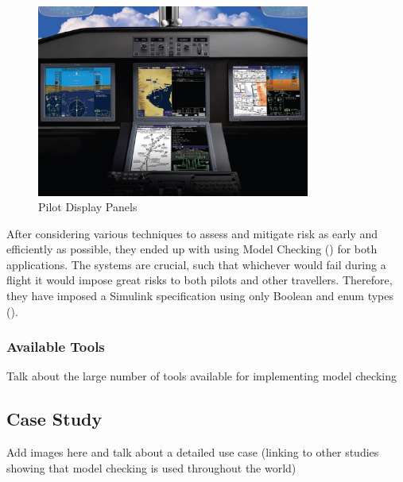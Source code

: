 \documentclass[paper=a4, fontsize=11pt]{scrartcl} %
\numberwithin{equation}{section} %
\numberwithin{figure}{section} %
\numberwithin{table}{section} %
\begin{document}
\begin{figure}[!ht]
    \centering
    \includegraphics[width=0.8\textwidth]{display-panels.jpg}
    \caption{Pilot Display Panels}
    \label{fig:awesome_image}
\end{figure}

After considering various techniques to assess and mitigate risk as early and efficiently as possible, they ended up with using Model Checking (\citet{rockwell-collins}) for both applications. The systems are crucial, such that whichever would fail during a flight it would impose great risks to both pilots and other travellers. Therefore, they have imposed a Simulink specification using only Boolean and enum types (\citet{acm-model-checking}).



\subsubsection{Available Tools}

\par
Talk about the large number of tools available for implementing model checking


\subsection{Case Study}

\par
Add images here and talk about a detailed use case (linking to other studies showing that model checking is used throughout the world)

\end{document}
